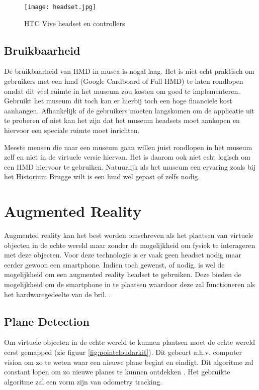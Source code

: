 \begin{figure}
    \texttt{[image: headset.jpg]}
    \caption{HTC Vive headset en controllers}
    \label{fig:htcvive}
\end{figure}

\subsection{Bruikbaarheid}
De bruikbaarheid van HMD in musea is nogal laag. Het is niet echt praktisch om gebruikers met een \acrshort{hmd} (Google Cardboard of Full HMD) te laten rondlopen omdat dit veel ruimte in het museum zou kosten om goed te implementeren. Gebruikt het museum dit toch kan er hierbij toch een hoge financiele kost aanhangen. Afhankelijk of de gebruikers moeten langskomen om de applicatie uit te proberen of niet kan het zijn dat het museum headsets moet aankopen en hiervoor een speciale ruimte moet inrichten.

Meeste mensen die naar een museum gaan willen juist rondlopen in het museum zelf en niet in de virtuele versie hiervan. Het is daarom ook niet echt logisch om een HMD hiervoor te gebruiken. Natuurlijk als het museum een ervaring zoals bij het Historium Brugge wilt is een \acrshort{hmd} wel gepast of zelfs nodig.

\section{Augmented Reality} \label{sec:augmentedreality}
Augmented reality kan het best worden omschreven als het plaatsen van virtuele objecten in de echte wereld maar zonder de mogelijkheid om fysiek te interageren met deze objecten. Voor deze technologie is er vaak geen headset nodig maar eerder gewoon een smartphone. Indien toch gewenst, of nodig, is wel de mogelijkheid om een augmented reality headset te gebruiken. Deze bieden de mogelijkheid om de smartphone in te plaatsen waardoor deze zal functioneren als het hardwaregedeelte van de bril. \autocite{Schops2014}.

\subsection{Plane Detection}
Om virtuele objecten in de echte wereld te kunnen plaatsen moet de echte wereld eerst gemapped (zie figuur \ref{fig:pointcloudarkit}). Dit gebeurt a.h.v. computer vision om zo te weten waar een nieuwe plane begint en eindigt. Dit algoritme zal constant lopen om zo nieuwe planes te kunnen ontdekken \autocite{Xu2018}. Het gebruikte algoritme zal een vorm zijn van odometry tracking.

